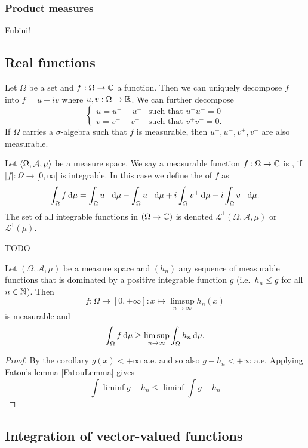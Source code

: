 \subsubsection{Product measures}
Fubini!

\subsection{Real functions}
Let $\Omega$ be a set and $f:\Omega \to \mathbb{C}$ a function.  Then we can uniquely decompose $f$ into $f= u+iv$ where $u,v: \Omega\to \mathbb{R}$. We can further decompose
\[ \begin{cases}
u = u^+ - u^- & \text{such that $u^+u^- = 0$} \\
v = v^+ - v^- & \text{such that $v^+v^- = 0$.}
\end{cases} \]
If $\Omega $ carries a $\sigma$-algebra such that $f$ is measurable, then $u^+,u^-,v^+,v^-$ are also measurable.
\begin{definition}
Let $\left\langle \Omega, \mathcal{A},\mu \right\rangle$ be a measure space. We say a measurable function $f: \Omega \to \mathbb{C}$ is , if $|f|:\Omega\to [0,\infty[$ is integrable. In this case we define the  of $f$ as
\[ \int_\Omega f\operatorname{d \!}{\mu} = \int_\Omega u^+\operatorname{d \!}{\mu} - \int_\Omega u^-\operatorname{d \!}{\mu} + i\int_\Omega v^+\operatorname{d \!}{\mu} - i\int_\Omega v^-\operatorname{d \!}{\mu}. \]
The set of all integrable functions in $(\Omega \to \mathbb{C})$ is denoted $\mathcal{L} ^1(\Omega,\mathcal{A},\mu)$ or $\mathcal{L} ^1(\mu)$.
\end{definition}

TODO
\begin{proposition}
Let $(\Omega, \mathcal{A}, \mu)$ be a measure space and $(h_n)$ any sequence of measurable functions that is dominated by a positive integrable function $g$ (i.e.\ $h_n\leq g$ for all $n\in\mathbb{N}$). Then
\[ f: \Omega\to[0,+\infty]: x\mapsto \limsup_{n\to\infty}h_n(x) \]
is measurable and
\[ \int_\Omega f\operatorname{d \!}{\mu} \geq \limsup_{n\to\infty}\int_\Omega h_n\operatorname{d \!}{\mu}. \]
\end{proposition}
\begin{proof}
By the corollary $g(x)<+\infty$ a.e. and so also $g-h_n<+\infty$ a.e. Applying Fatou's lemma \ref{FatouLemma} gives
\[ \int\liminf g-h_n \leq \liminf\int g-h_n\]
\end{proof}


\subsection{Integration of vector-valued functions}
